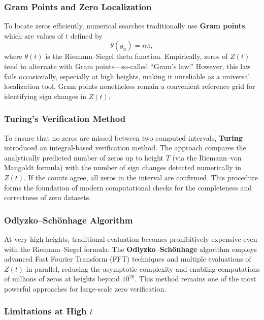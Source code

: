 \documentclass[11pt,a4paper]{article}
\begin{document}
\subsubsection*{Gram Points and Zero Localization}

To locate zeros efficiently, numerical searches traditionally use \textbf{Gram points}, which are values of \( t \) defined by
\[
\theta(g_n) = n\pi,
\]
where \( \theta(t) \) is the Riemann–Siegel theta function.  
Empirically, zeros of \( Z(t) \) tend to alternate with Gram points—so-called “Gram’s law.”  
However, this law fails occasionally, especially at high heights, making it unreliable as a universal localization tool.  
Gram points nonetheless remain a convenient reference grid for identifying sign changes in \( Z(t) \).

\subsubsection*{Turing’s Verification Method}

To ensure that no zeros are missed between two computed intervals, \textbf{Turing} introduced an integral-based verification method.  
The approach compares the analytically predicted number of zeros up to height \( T \) (via the Riemann–von Mangoldt formula) with the number of sign changes detected numerically in \( Z(t) \).  
If the counts agree, all zeros in the interval are confirmed.  
This procedure forms the foundation of modern computational checks for the completeness and correctness of zero datasets.

\subsubsection*{Odlyzko--Schönhage Algorithm}

At very high heights, traditional evaluation becomes prohibitively expensive even with the Riemann–Siegel formula.  
The \textbf{Odlyzko–Schönhage} algorithm employs advanced Fast Fourier Transform (FFT) techniques and multiple evaluations of \( Z(t) \) in parallel, reducing the asymptotic complexity and enabling computations of millions of zeros at heights beyond \( 10^{20} \).  
This method remains one of the most powerful approaches for large-scale zero verification.

\subsubsection*{Limitations at High \( t \)}
\end{document}
